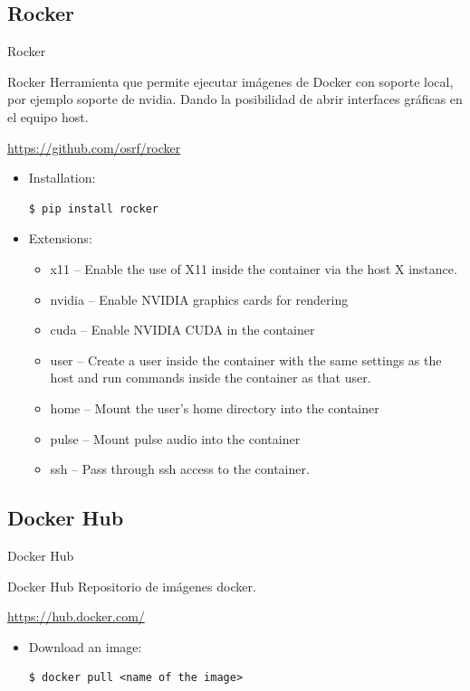 \subsection{Rocker}
\begin{frame}[fragile]{Rocker}

 \begin{alertblock}{Rocker}
  Herramienta que permite ejecutar imágenes de Docker con soporte local, por ejemplo soporte de nvidia. Dando la posibilidad de abrir interfaces gráficas en el equipo host. 
  
  \url{https://github.com/osrf/rocker}
 \end{alertblock}

\begin{itemize}
    \item Installation:
\begin{lstlisting}[language=shell]
$ pip install rocker
\end{lstlisting}

    \item Extensions:
    \begin{itemize}
        \item x11 -- Enable the use of X11 inside the container via the host X instance.
        \item nvidia -- Enable NVIDIA graphics cards for rendering
        \item cuda -- Enable NVIDIA CUDA in the container
        \item user -- Create a user inside the container with the same settings as the host and run commands inside the container as that user.
        \item home -- Mount the user's home directory into the container
        \item pulse -- Mount pulse audio into the container
        \item ssh -- Pass through ssh access to the container.
    \end{itemize}
\end{itemize}
    
\end{frame}

\subsection{Docker Hub}
\begin{frame}[fragile]{Docker Hub}
\begin{alertblock}{Docker Hub}
    Repositorio de imágenes docker.
  
  \url{https://hub.docker.com/}
 \end{alertblock}
 
\begin{itemize}
    \item Download an image:
\begin{lstlisting}[language=shell]
$ docker pull <name of the image>
\end{lstlisting}
    
\end{itemize}
    
\end{frame}

